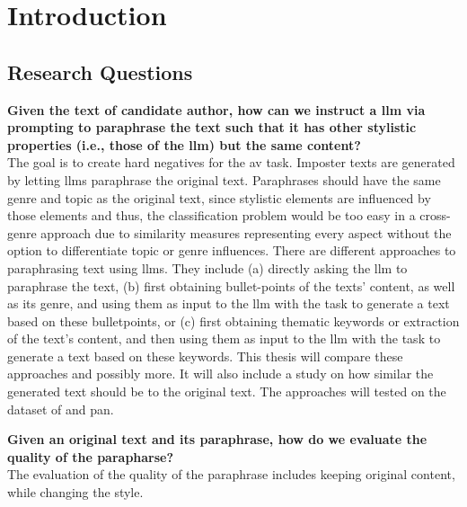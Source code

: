 \chapter{Introduction}
\label{chap:introduction}





\section{Research Questions}
\label{sec:research_questions}

\begin{questions}
    \item \textbf{Given the text of candidate author, how can we instruct a \ac{llm} via prompting to paraphrase the text such that it has other stylistic properties (i.e., those of the \ac{llm}) but the same content?} \label{enum:rq1} \hfill \\
    The goal is to create hard negatives for the \ac{av} task.
    Imposter texts are generated by letting \acp{llm} paraphrase the original text.
    Paraphrases should have the same genre and topic as the original text, 
    since stylistic elements are influenced by those elements and thus, 
    the classification problem would be too easy in a cross-genre approach 
    due to similarity measures representing every aspect without the option to differentiate topic or genre influences.
    There are different approaches to paraphrasing text using \acp{llm}.
    They include (a) directly asking the \ac{llm} to paraphrase the text, 
    (b) first obtaining bullet-points of the texts' content, as well as its genre, and using them as input to the \ac{llm} with the task to generate a text based on these bulletpoints, 
    or (c) first obtaining thematic keywords or extraction of the text's content, and then using them as input to the \ac{llm} with the task to generate a text based on these keywords.
    This thesis will compare these approaches and possibly more.
    It will also include a study on how similar the generated text should be to the original text.
    The approaches will tested on the dataset of \citet{koppel_determining_2014} and \ac{pan}.

    \item \textbf{Given an original text and its paraphrase, how do we evaluate the quality of the parapharse?} \label{enum:rq2} \hfill \\
    The evaluation of the quality of the paraphrase includes keeping original content, while changing the style.


\end{questions}
